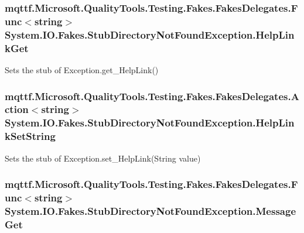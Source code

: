 \hypertarget{class_system_1_1_i_o_1_1_fakes_1_1_stub_directory_not_found_exception_ac2a0487ed3a2bd35cbe077b0231e68e9}{
\subsubsection[{Help\-Link\-Get}]{\setlength{\rightskip}{0pt plus 5cm}mqttf.\-Microsoft.\-Quality\-Tools.\-Testing.\-Fakes.\-Fakes\-Delegates.\-Func$<$string$>$ System.\-I\-O.\-Fakes.\-Stub\-Directory\-Not\-Found\-Exception.\-Help\-Link\-Get}}\label{class_system_1_1_i_o_1_1_fakes_1_1_stub_directory_not_found_exception_ac2a0487ed3a2bd35cbe077b0231e68e9}


Sets the stub of Exception.\-get\-\_\-\-Help\-Link()

\hypertarget{class_system_1_1_i_o_1_1_fakes_1_1_stub_directory_not_found_exception_ac544a022a8cc0576bff5c6ff7d97a879}{
\subsubsection[{Help\-Link\-Set\-String}]{\setlength{\rightskip}{0pt plus 5cm}mqttf.\-Microsoft.\-Quality\-Tools.\-Testing.\-Fakes.\-Fakes\-Delegates.\-Action$<$string$>$ System.\-I\-O.\-Fakes.\-Stub\-Directory\-Not\-Found\-Exception.\-Help\-Link\-Set\-String}}\label{class_system_1_1_i_o_1_1_fakes_1_1_stub_directory_not_found_exception_ac544a022a8cc0576bff5c6ff7d97a879}


Sets the stub of Exception.\-set\-\_\-\-Help\-Link(\-String value)

\hypertarget{class_system_1_1_i_o_1_1_fakes_1_1_stub_directory_not_found_exception_ae3c35a60c32f32dcf4f5ce8a7f3913c8}{
\subsubsection[{Message\-Get}]{\setlength{\rightskip}{0pt plus 5cm}mqttf.\-Microsoft.\-Quality\-Tools.\-Testing.\-Fakes.\-Fakes\-Delegates.\-Func$<$string$>$ System.\-I\-O.\-Fakes.\-Stub\-Directory\-Not\-Found\-Exception.\-Message\-Get}}\label{class_system_1_1_i_o_1_1_fakes_1_1_stub_directory_not_found_exception_ae3c35a60c32f32dcf4f5ce8a7f3913c8}


